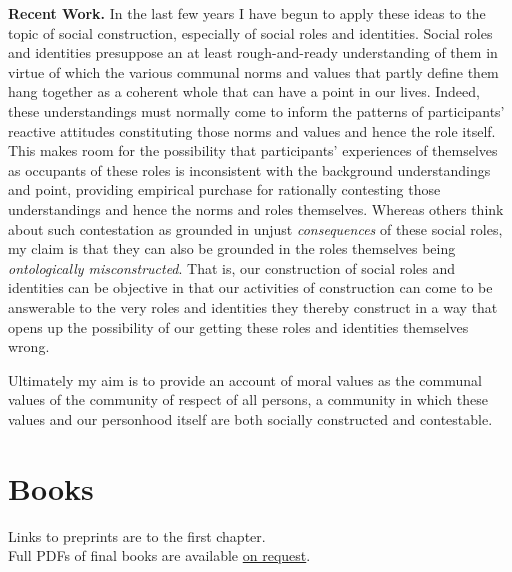 \documentclass[%
  11pt,%
]{article}
\makeatletter
\newcommand{\onrequest}{\href{mailto:bhelm@fandm.edu}{on request}}
\makeatother
\begin{document}
\noindent\textbf{Recent Work.} In the last few years I have begun to apply these ideas to the topic of social construction, especially of social roles and identities. Social roles and identities presuppose an at least rough-and-ready understanding of them in virtue of which the various communal norms and values that partly define them hang together as a coherent whole that can have a point in our lives. Indeed, these understandings must normally come to inform the patterns of participants' reactive attitudes constituting those norms and values and hence the role itself. This makes room for the possibility that participants' experiences of themselves as occupants of these roles is inconsistent with the background understandings and point, providing empirical purchase for rationally contesting those understandings and hence the norms and roles themselves. Whereas others think about such contestation as grounded in unjust \emph{consequences} of these social roles, my claim is that they can also be grounded in the roles themselves being \emph{ontologically misconstructed}. That is, our construction of social roles and identities can be objective in that our activities of construction can come to be answerable to the very roles and identities they thereby construct in a way that opens up the possibility of our getting these roles and identities themselves wrong.

\bigskip{}

Ultimately my aim is to provide an account of moral values as the communal values of the community of respect of all persons, a community in which these values and our personhood itself are both socially constructed and contestable.


\section{Books}

\newrefsection

\begin{center}
  Links to preprints are to the first chapter.\\
  Full PDFs of final books are available \onrequest{}.\\
  ~
\end{center}
\end{document}
